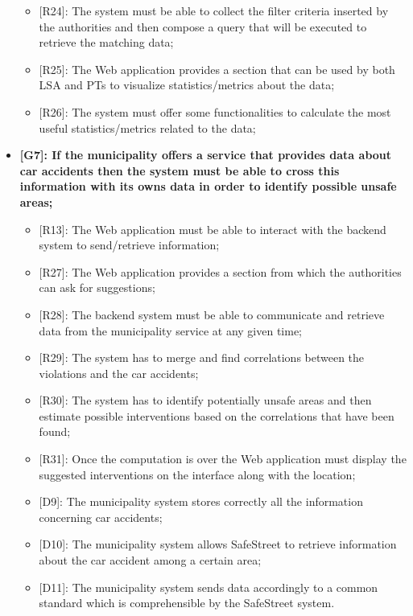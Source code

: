 \begin{itemize}
\begin{itemize}
      \item {[R24]}: The system must be able to collect the filter criteria inserted by the authorities and then compose a query that will be executed to retrieve the matching data;
      \item {[R25]}: The Web application provides a section that can be used by both LSA and PTs to visualize statistics/metrics about the data;
      \item {[R26]}: The system must offer some functionalities to calculate the most useful statistics/metrics related to the data;
    \end{itemize}
  \item \textbf{{[G7]}: If the municipality offers a service that provides data about car accidents then the system must be able to cross this information with its owns data in order to identify possible unsafe areas;}
    \begin{itemize}
      \item {[R13]}: The Web application must be able to interact with the backend system to send/retrieve information;
      \item {[R27]}: The Web application provides a section from which the authorities can ask for suggestions;
      \item {[R28]}: The backend system must be able to communicate and retrieve data from the municipality service at any given time;
      \item {[R29]}: The system has to merge and find correlations between the violations and the car accidents;
      \item {[R30]}: The system has to identify potentially unsafe areas and then estimate possible interventions based on the correlations that have been found;
      \item {[R31]}: Once the computation is over the Web application must display the suggested interventions on the interface along with the location;
      \item {[D9]}: The municipality system stores correctly all the information concerning car accidents;
      \item {[D10]}: The municipality system allows SafeStreet to retrieve information about the car accident among a certain area;
      \item {[D11]}: The municipality system sends data accordingly to a common standard which is comprehensible by the SafeStreet system. 
    \end{itemize}
\end{itemize}
